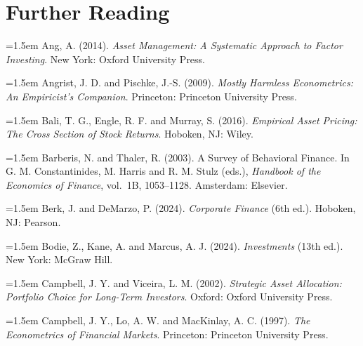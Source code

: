 \chapter*{Further Reading}
\label{furtherreading}


\begingroup
\footnotesize
\setlength{\parindent}{0pt}
\setlength{\parskip}{1pt}   %


\hangindent=1.5em Ang, A. (2014). \emph{Asset Management: A Systematic Approach to Factor Investing}. New York: Oxford University Press.

\hangindent=1.5em Angrist, J. D. and Pischke, J.-S. (2009). \emph{Mostly Harmless Econometrics: An Empiricist's Companion}. Princeton: Princeton University Press.

\hangindent=1.5em Bali, T. G., Engle, R. F. and Murray, S. (2016). \emph{Empirical Asset Pricing: The Cross Section of Stock Returns}. Hoboken, NJ: Wiley.

\hangindent=1.5em Barberis, N. and Thaler, R. (2003). A Survey of Behavioral Finance. In G. M. Constantinides, M. Harris and R. M. Stulz (eds.), \emph{Handbook of the Economics of Finance}, vol.\ 1B, 1053--1128. Amsterdam: Elsevier.

\hangindent=1.5em Berk, J. and DeMarzo, P. (2024). \emph{Corporate Finance} (6th ed.). Hoboken, NJ: Pearson.

\hangindent=1.5em Bodie, Z., Kane, A. and Marcus, A. J. (2024). \emph{Investments} (13th ed.). New York: McGraw Hill.

\hangindent=1.5em Campbell, J. Y. and Viceira, L. M. (2002). \emph{Strategic Asset Allocation: Portfolio Choice for Long-Term Investors}. Oxford: Oxford University Press.

\hangindent=1.5em Campbell, J. Y., Lo, A. W. and MacKinlay, A. C. (1997). \emph{The Econometrics of Financial Markets}. Princeton: Princeton University Press.

